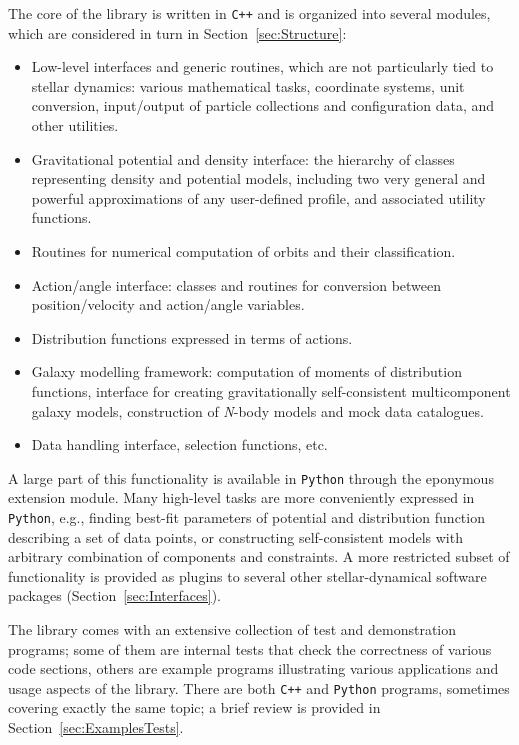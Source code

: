 \documentclass[12pt]{article}
\newcommand{\Nbody}{\textsl{N}-body\xspace}
\newcommand{\Cpp}  {\texttt{C++}\xspace}
\newcommand{\Python}{\texttt{Python}\xspace}
\begin{document}
The core of the library is written in \Cpp and is organized into several modules, which are considered in turn in Section~\ref{sec:Structure}:
\begin{itemize}  \setlength{\parskip}{2pt} \setlength{\itemsep}{2pt}
\item Low-level interfaces and generic routines, which are not particularly tied to stellar dynamics: various mathematical tasks, coordinate systems, unit conversion, input/output of particle collections and configuration data, and other utilities.
\item Gravitational potential and density interface: the hierarchy of classes representing density and potential models, including two very general and powerful approximations of any user-defined profile, and associated utility functions.
\item Routines for numerical computation of orbits and their classification.
\item Action/angle interface: classes and routines for conversion between position/velocity and action/angle variables.
\item Distribution functions expressed in terms of actions.
\item Galaxy modelling framework: computation of moments of distribution functions, interface for creating gravitationally self-consistent multicomponent galaxy models, construction of \Nbody models and mock data catalogues.
\item Data handling interface, selection functions, etc.
\end{itemize}

A large part of this functionality is available in \Python through the eponymous extension module. Many high-level tasks are more conveniently expressed in \Python, e.g., finding best-fit parameters of potential and distribution function describing a set of data points, or constructing self-consistent models with arbitrary combination of components and constraints.
A more restricted subset of functionality is provided as plugins to several other stellar-dynamical software packages (Section~\ref{sec:Interfaces}).

The library comes with an extensive collection of test and demonstration programs; some of them are internal tests that check the correctness of various code sections, others are example programs illustrating various applications and usage aspects of the library. There are both \Cpp and \Python programs, sometimes covering exactly the same topic; a brief review is provided in Section~\ref{sec:ExamplesTests}.
\end{document}
